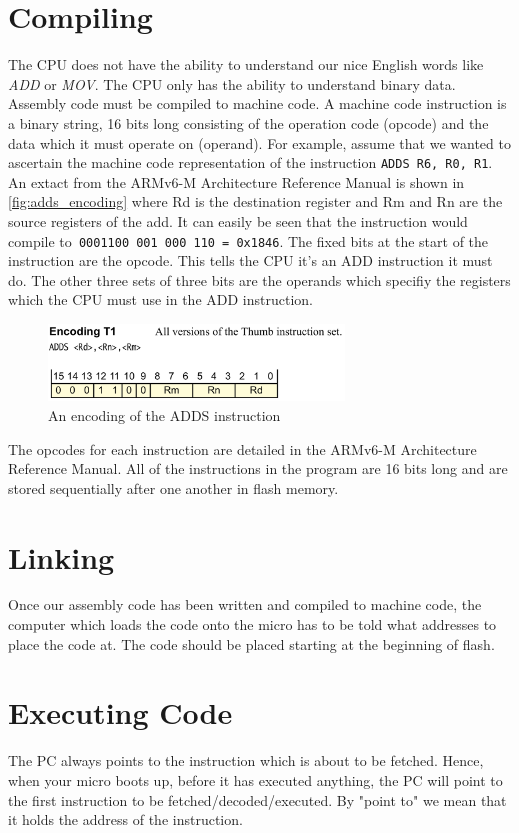 \section{Compiling}
The CPU does not have the ability to understand our nice English words like \textit{ADD} or \textit{MOV}. The CPU only has the ability to understand binary data. Assembly code must be compiled to machine code. A machine code instruction is a binary string, 16 bits long consisting of the operation code (opcode) and the data which it must operate on (operand).
For example, assume that we wanted to ascertain the machine code representation of the instruction \texttt{ADDS R6, R0, R1}. An extact from the ARMv6-M Architecture Reference Manual is shown in \autoref{fig:adds_encoding} where Rd is the destination register and Rm and Rn are the source registers of the add. It can easily be seen that the instruction would compile to\texttt{ 0001100 001 000 110 = 0x1846}. The fixed bits at the start of the instruction are the opcode. This tells the CPU it's an ADD instruction it must do. The other three sets of three bits are the operands which specifiy the registers which the CPU must use in the ADD instruction. 
\begin{figure}
  \centering
  \includegraphics[width=0.7\textwidth]{./fig/adds_encoding.png}
  \caption{An encoding of the ADDS instruction}
  \label{fig:adds_encoding}
\end{figure}
The opcodes for each instruction are detailed in the ARMv6-M Architecture Reference Manual.
All of the instructions in the program are 16 bits long and are stored sequentially after one another in flash memory. 

\section{Linking}
Once our assembly code has been written and compiled to machine code, the computer which loads the code onto the micro has to be told what addresses to place the code at. The code should be placed starting at the beginning of flash.

\section{Executing Code}
The PC always points to the instruction which is about to be fetched. Hence, when your micro boots up, before it has executed anything, the PC will point to the first instruction to be fetched/decoded/executed. By "point to" we mean that it holds the address of the instruction. 

